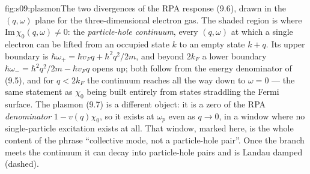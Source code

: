 \begin{aqmfigure}{fig:s09:plasmon}{The two divergences of the RPA response (9.6), drawn in the
$(q,\omega)$ plane for the three-dimensional electron gas. The shaded region is where
$\mathrm{Im}\,\chi_0(q,\omega)\neq0$: the \emph{particle-hole continuum}, every $(q,\omega)$ at
which a single electron can be lifted from an occupied state $k$ to an empty state $k+q$. Its upper
boundary is $\hbar\omega_+=\hbar v_Fq+\hbar^2q^2/2m$, and beyond $2k_F$ a lower boundary
$\hbar\omega_-=\hbar^2q^2/2m-\hbar v_Fq$ opens up; both follow from the energy denominator of (9.5),
and for $q<2k_F$ the continuum reaches all the way down to $\omega=0$ --- the same statement as
$\chi_0$ being built entirely from states straddling the Fermi surface. The plasmon (9.7) is a
different object: it is a zero of the RPA \emph{denominator} $1-v(q)\chi_0$, so it exists at
$\omega_p$ even as $q\to0$, in a window where no single-particle excitation exists at all. That
window, marked here, is the whole content of the phrase ``collective mode, not a particle-hole
pair''. Once the branch meets the continuum it can decay into particle-hole pairs and is Landau
damped (dashed).}

\end{aqmfigure}
